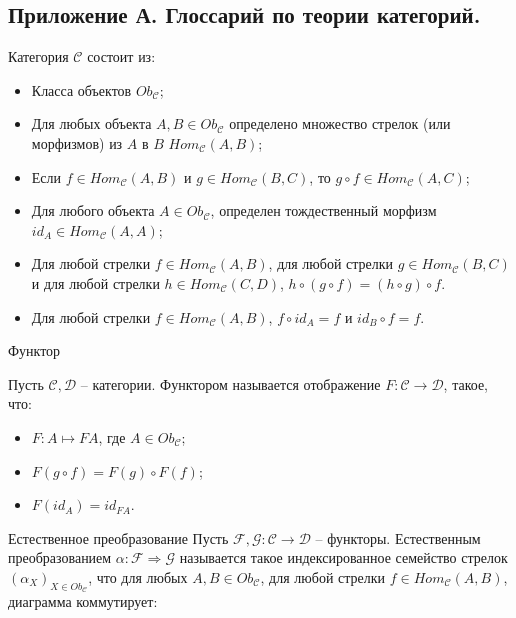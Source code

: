 \subsection{Приложение А. Глоссарий по теории категорий.}

\begin{defin}

  Категория $\mathcal{C}$ состоит из:
  \begin{itemize}
    \item Класса объектов $Ob_{\mathcal{C}}$;
    \item Для любых объекта $A, B \in Ob_{\mathcal{C}}$ определено множество стрелок (или морфизмов) из $A$ в $B$ $Hom_{\mathcal{C}}(A, B)$;
    \item Если $f \in Hom_{\mathcal{C}}(A, B)$ и $g \in Hom_{\mathcal{C}}(B,C)$, то $g \circ f \in Hom_{\mathcal{C}}(A, C)$;
    \item Для любого объекта $A \in Ob_{\mathcal{C}}$, определен тождественный морфизм $id_A \in Hom_{\mathcal{C}}(A, A)$;
    \item Для любой стрелки $f \in Hom_{\mathcal{C}}(A, B)$, для любой стрелки $g \in Hom_{\mathcal{C}}(B,C)$ и для любой стрелки $h \in Hom_{\mathcal{C}}(C,D)$, $h \circ (g \circ f) = (h \circ g) \circ f$.
    \item Для любой стрелки $f \in Hom_{\mathcal{C}}(A, B)$, $f \circ id_A = f$ и $id_B \circ f = f$.
  \end{itemize}
\end{defin}


\begin{defin} Функтор

  Пусть $\mathcal{C}, \mathcal{D}$ -- категории. Функтором называется отображение $F : \mathcal{C} \to \mathcal{D}$, такое, что:
  \begin{itemize}
    \item $F : A \mapsto F A$, где $A \in Ob_{\mathcal{C}}$;
    \item $F (g \circ f) = F(g) \circ F(f)$;
    \item $F (id_A) = id_{F A}$.
  \end{itemize}
\end{defin}

\begin{defin} Естественное преобразование
  Пусть $\mathcal{F}, \mathcal{G} : \mathcal{C} \to \mathcal{D}$ -- функторы.
  Естественным преобразованием $\alpha : \mathcal{F} \Rightarrow \mathcal{G}$ называется такое индексированное семейство стрелок $(\alpha_{X})_{X \in Ob_{\mathcal{C}}}$,
что для любых $A, B \in Ob_{\mathcal{C}}$, для любой стрелки $f \in Hom_{\mathcal{C}}(A, B)$, диаграмма коммутирует:

\end{defin}

